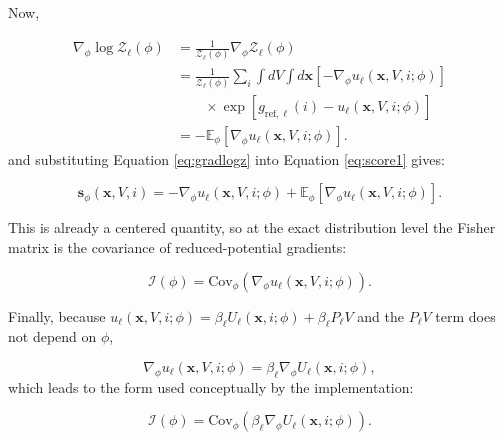 Now,

\begin{align}
    \nabla_\phi \log \mathcal{Z}_\ell(\phi)
    &=
    \frac{1}{\mathcal{Z}_\ell(\phi)}
    \nabla_\phi \mathcal{Z}_\ell(\phi)
    \nonumber \\
    &=
    \frac{1}{\mathcal{Z}_\ell(\phi)}
    \sum_i \int dV \int d\mathbf{x}
    \left[
        -
        \nabla_\phi u_\ell(\mathbf{x}, V, i; \phi)
    \right]
    \nonumber \\
    &\qquad \times
    \exp \left[
        g_{\mathrm{ref},\ell}(i)
        -
        u_\ell(\mathbf{x}, V, i; \phi)
    \right]
    \nonumber \\
    &=
    -
    \mathbb{E}_\phi
    \left[
        \nabla_\phi u_\ell(\mathbf{x}, V, i; \phi)
    \right].
    \label{eq:gradlogz}
\end{align}
%
and substituting Equation \eqref{eq:gradlogz} into Equation \eqref{eq:score1} gives:

\begin{equation}
    \mathbf{s}_\phi(\mathbf{x}, V, i)
    =
    -
    \nabla_\phi u_\ell(\mathbf{x}, V, i; \phi)
    +
    \mathbb{E}_\phi
    \left[
        \nabla_\phi u_\ell(\mathbf{x}, V, i; \phi)
    \right].
    \label{eq:score2}
\end{equation}

This is already a centered quantity, so at the exact distribution level the Fisher matrix is the covariance of reduced-potential gradients:

\begin{equation}
    \mathcal{I}(\phi)
    =
    \mathrm{Cov}_\phi
    \left(
        \nabla_\phi u_\ell(\mathbf{x}, V, i; \phi)
    \right).
    \label{eq:fimcovu}
\end{equation}

Finally, because $u_\ell(\mathbf{x}, V, i; \phi) = \beta_\ell U_\ell(\mathbf{x}, i; \phi) + \beta_\ell P_\ell V$ and the $P_\ell V$ term does not depend on $\phi$,

\begin{equation}
    \nabla_\phi u_\ell(\mathbf{x}, V, i; \phi)
    =
    \beta_\ell
    \nabla_\phi U_\ell(\mathbf{x}, i; \phi),
    \label{eq:gradubeta}
\end{equation}
%
which leads to the form used conceptually by the implementation:

\begin{equation}
    \mathcal{I}(\phi)
    =
    \mathrm{Cov}_\phi
    \left(
        \beta_\ell
        \nabla_\phi U_\ell(\mathbf{x}, i; \phi)
    \right).
    \label{eq:fimcovgradu}
\end{equation}

